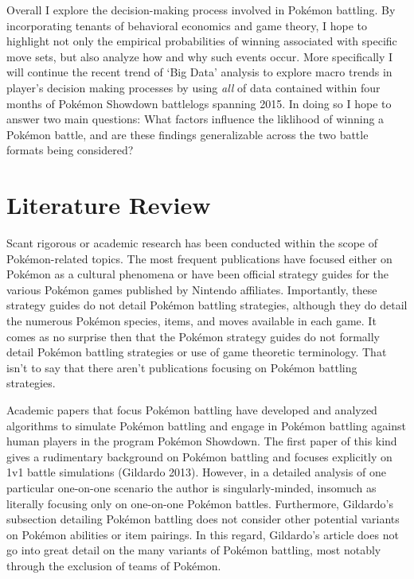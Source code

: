 \documentclass[12pt,twoside]{reedthesis}
\begin{document}
  Overall I explore the decision-making process involved in Pokémon
  battling. By incorporating tenants of behavioral economics and game
  theory, I hope to highlight not only the empirical probabilities of
  winning associated with specific move sets, but also analyze how and why
  such events occur. More specifically I will continue the recent trend of
  `Big Data' analysis to explore macro trends in player's decision making
  processes by using \emph{all} of data contained within four months of
  Pokémon Showdown battlelogs spanning 2015. In doing so I hope to answer
  two main questions: What factors influence the liklihood of winning a
  Pokémon battle, and are these findings generalizable across the two
  battle formats being considered?
  
  \section{Literature Review}\label{literature-review}
  
  Scant rigorous or academic research has been conducted within the scope
  of Pokémon-related topics. The most frequent publications have focused
  either on Pokémon as a cultural phenomena or have been official strategy
  guides for the various Pokémon games published by Nintendo affiliates.
  Importantly, these strategy guides do not detail Pokémon battling
  strategies, although they do detail the numerous Pokémon species, items,
  and moves available in each game. It comes as no surprise then that the
  Pokémon strategy guides do not formally detail Pokémon battling
  strategies or use of game theoretic terminology. That isn't to say that
  there aren't publications focusing on Pokémon battling strategies.
  
  Academic papers that focus Pokémon battling have developed and analyzed
  algorithms to simulate Pokémon battling and engage in Pokémon battling
  against human players in the program Pokémon Showdown. The first paper
  of this kind gives a rudimentary background on Pokémon battling and
  focuses explicitly on 1v1 battle simulations (Gildardo 2013). However,
  in a detailed analysis of one particular one-on-one scenario the author
  is singularly-minded, insomuch as literally focusing only on one-on-one
  Pokémon battles. Furthermore, Gildardo's subsection detailing Pokémon
  battling does not consider other potential variants on Pokémon abilities
  or item pairings. In this regard, Gildardo's article does not go into
  great detail on the many variants of Pokémon battling, most notably
  through the exclusion of teams of Pokémon.
  
\end{document}
